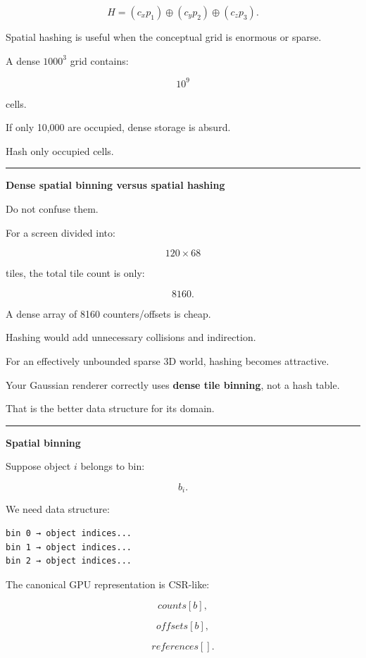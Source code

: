 \[
H=
(c_xp_1)
\oplus
(c_yp_2)
\oplus
(c_zp_3).
\]

Spatial hashing is useful when the conceptual grid is enormous or sparse.

A dense \(1000^3\) grid contains:

\[
10^9
\]

cells.

If only 10,000 are occupied, dense storage is absurd.

Hash only occupied cells.

\begin{center}\rule{0.5\linewidth}{0.5pt}\end{center}

\textbf{Dense spatial binning versus spatial hashing}

Do not confuse them.

For a screen divided into:

\[
120\times68
\]

tiles, the total tile count is only:

\[
8160.
\]

A dense array of 8160 counters/offsets is cheap.

Hashing would add unnecessary collisions and indirection.

For an effectively unbounded sparse 3D world, hashing becomes attractive.

Your Gaussian renderer correctly uses \textbf{dense tile binning}, not a hash table.

That is the better data structure for its domain.

\begin{center}\rule{0.5\linewidth}{0.5pt}\end{center}

\textbf{Spatial binning}

Suppose object \(i\) belongs to bin:

\[
b_i.
\]

We need data structure:

\protect{}\label{p10-csr-bins}%
\begin{verbatim}
bin 0 → object indices...
bin 1 → object indices...
bin 2 → object indices...
\end{verbatim}

The canonical GPU representation is CSR-like:

\[
counts[b],
\]

\[
offsets[b],
\]

\[
references[].
\]

